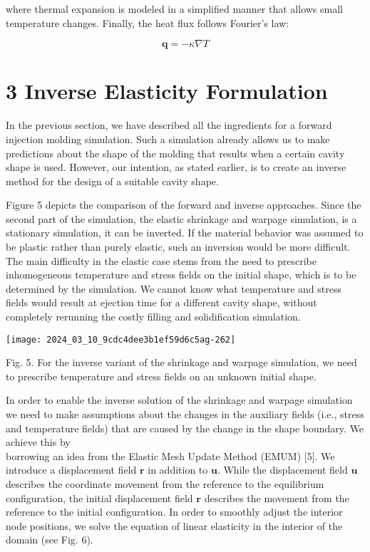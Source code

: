 \documentclass[10pt]{article}
\begin{document}
where thermal expansion is modeled in a simplified manner that allows small temperature changes. Finally, the heat flux follows Fourier's law:

$$
\mathbf{q}=-\kappa \nabla T
$$

\section*{3 Inverse Elasticity Formulation}
In the previous section, we have described all the ingredients for a forward injection molding simulation. Such a simulation already allows us to make predictions about the shape of the molding that results when a certain cavity shape is used. However, our intention, as stated earlier, is to create an inverse method for the design of a suitable cavity shape.

Figure 5 depicts the comparison of the forward and inverse approaches. Since the second part of the simulation, the elastic shrinkage and warpage simulation, is a stationary simulation, it can be inverted. If the material behavior was assumed to be plastic rather than purely elastic, such an inversion would be more difficult. The main difficulty in the elastic case stems from the need to prescribe inhomogeneous temperature and stress fields on the initial shape, which is to be determined by the simulation. We cannot know what temperature and stress fields would result at ejection time for a different cavity shape, without completely rerunning the costly filling and solidification simulation.

\begin{center}
\texttt{[image: 2024\_03\_10\_9cdc4dee3b1ef59d6c5ag-262]}
\end{center}

Fig. 5. For the inverse variant of the shrinkage and warpage simulation, we need to prescribe temperature and stress fields on an unknown initial shape.

In order to enable the inverse solution of the shrinkage and warpage simulation we need to make assumptions about the changes in the auxiliary fields (i.e., stress and temperature fields) that are caused by the change in the shape boundary. We achieve this by\\
borrowing an idea from the Elastic Mesh Update Method (EMUM) [5]. We introduce a displacement field $\mathbf{r}$ in addition to $\mathbf{u}$. While the displacement field $\mathbf{u}$ describes the coordinate movement from the reference to the equilibrium configuration, the initial displacement field $\mathbf{r}$ describes the movement from the reference to the initial configuration. In order to smoothly adjust the interior node positions, we solve the equation of linear elasticity in the interior of the domain (see Fig. 6).
\end{document}
